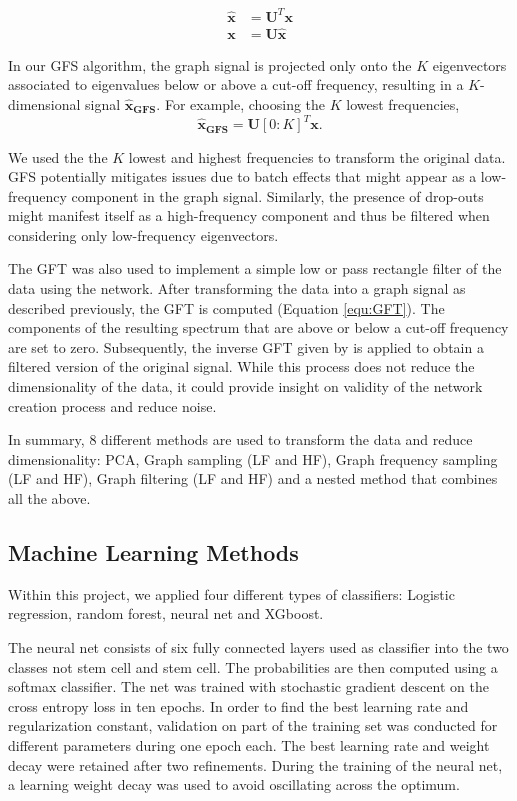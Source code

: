 \documentclass[10pt,conference,compsocconf]{IEEEtran}
\begin{document}
\begin{align}\label{equ:GFT}
\boldsymbol{\hat{x}} &= \boldsymbol{U}^T \boldsymbol{x}\\
\boldsymbol{x} &= \boldsymbol{U} \boldsymbol{\hat{x}}
\end{align} 
\par
In our GFS algorithm, the graph signal is projected only onto the $K$ eigenvectors associated to eigenvalues below or above a cut-off frequency, resulting in a $K$-dimensional signal $\boldsymbol{\hat{x}_{GFS}}$. For example, choosing the $K$ lowest frequencies,
\begin{equation}
\boldsymbol{\hat{x}_{GFS}} = \boldsymbol{U}[0:K]^T \boldsymbol{x}.
\end{equation} 
\par
We used the the $K$ lowest and highest frequencies to transform the original data. GFS potentially mitigates issues due to batch effects that might appear as a low-frequency component in the graph signal. Similarly, the presence of drop-outs might manifest itself as a high-frequency component and thus be filtered when considering only low-frequency eigenvectors.\\
\par
The GFT was also used to implement a simple low or pass rectangle filter of the data using the network. After transforming the data into a graph signal as described previously, the GFT is computed (Equation \ref{equ:GFT}). The components of the resulting spectrum that are above or below a cut-off frequency are set to zero. Subsequently, the inverse GFT given by is applied to obtain a filtered version of the original signal. While this process does not reduce the dimensionality of the data, it could provide insight on validity of the network creation process and reduce noise.
\par
In summary, 8 different methods are used to transform the data and reduce dimensionality: PCA, Graph sampling (LF and HF), Graph frequency sampling (LF and HF), Graph filtering (LF and HF) and a nested method that combines all the above.

\subsection{Machine Learning Methods}
Within this project, we applied four different types of classifiers: Logistic regression, random forest, neural net and XGboost.
\par

The neural net consists of six fully connected layers used as classifier into the two classes not stem cell and stem cell. The probabilities are then computed using a softmax classifier. The net was trained with stochastic gradient descent on the cross entropy loss in ten epochs. In order to find the best learning rate and regularization constant, validation on part of the training set was conducted for different parameters during one epoch each. The best learning rate and weight decay were retained after two refinements. During the training of the neural net, a learning weight decay was used to avoid oscillating across the optimum.
\end{document}
